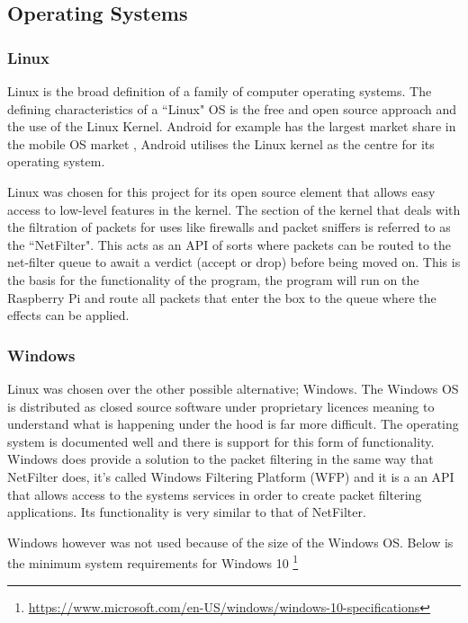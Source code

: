 \subsection{Operating Systems}

\subsubsection{Linux}
Linux is the broad definition of a family of computer operating systems. The defining characteristics of a ``Linux" OS is the free and open source approach and the use of the Linux Kernel. Android for example has the largest market share in the mobile OS market \citep{share2015desktop}, Android utilises the Linux kernel as the centre for its operating system.

Linux was chosen for this project for its open source element that allows easy access to low-level features in the kernel. The section of the kernel that deals with the filtration of packets for uses like firewalls and packet sniffers is referred to as the ``NetFilter". This acts as an API of sorts where packets can be routed to the net-filter queue to await a verdict (accept or drop) before being moved on. This is the basis for the functionality of the program, the program will run on the Raspberry Pi and route all packets that enter the box to the queue where the effects can be applied.

\subsubsection{Windows}
Linux was chosen over the other possible alternative; Windows. The Windows OS is distributed as closed source software under proprietary licences meaning to understand what is happening under the hood is far more difficult. The operating system is documented well and there is support for this form of functionality. Windows does provide a solution to the packet filtering in the same way that NetFilter does, it's called Windows Filtering Platform (WFP) and it is a an API that allows access to the systems services in order to create packet filtering applications. Its functionality is very similar to that of NetFilter.

Windows however was not used because of the size of the Windows OS. Below is the minimum system requirements for Windows 10 \footnote{\url{https://www.microsoft.com/en-US/windows/windows-10-specifications}}


